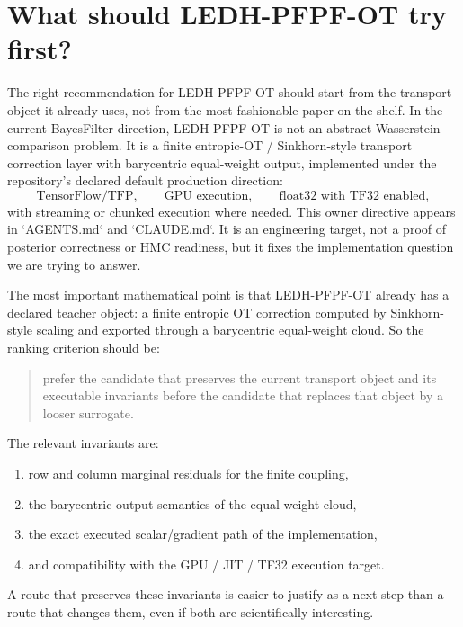 \documentclass[11pt]{report}
\begin{document}
\section{What should LEDH-PFPF-OT try first?}

The right recommendation for LEDH-PFPF-OT should start from the transport object it
already uses, not from the most fashionable paper on the shelf.  In the current
BayesFilter direction, LEDH-PFPF-OT is not an abstract Wasserstein comparison
problem.  It is a finite entropic-OT / Sinkhorn-style transport correction layer with
barycentric equal-weight output, implemented under the repository's declared default
production direction:
\begin{equation}
\text{TensorFlow/TFP},\qquad \text{GPU execution},\qquad \text{float32 with TF32 enabled},
\label{eq:ledhpfpfot-default-direction}
\end{equation}
with streaming or chunked execution where needed.  This owner directive appears in
`AGENTS.md` and `CLAUDE.md`.  It is an engineering target, not a proof of posterior
correctness or HMC readiness, but it fixes the implementation question we are trying
to answer.

The most important mathematical point is that LEDH-PFPF-OT already has a declared
teacher object: a finite entropic OT correction computed by Sinkhorn-style scaling and
exported through a barycentric equal-weight cloud.  So the ranking criterion should be:
\begin{quote}
prefer the candidate that preserves the current transport object and its executable
invariants before the candidate that replaces that object by a looser surrogate.
\end{quote}
The relevant invariants are:
\begin{enumerate}[label=(\roman*)]
  \item row and column marginal residuals for the finite coupling,
  \item the barycentric output semantics of the equal-weight cloud,
  \item the exact executed scalar/gradient path of the implementation,
  \item and compatibility with the GPU / JIT / TF32 execution target.
\end{enumerate}
A route that preserves these invariants is easier to justify as a next step than a
route that changes them, even if both are scientifically interesting.
\end{document}
